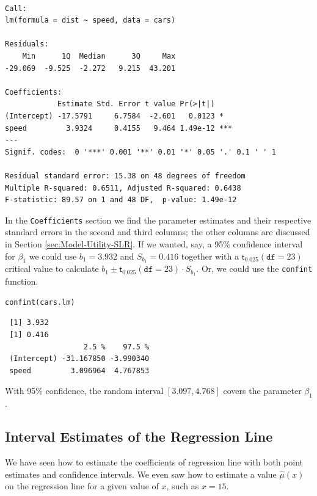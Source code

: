 \documentclass[captions=tableheading]{scrbook}
\begin{document}
\begin{verbatim}
 
Call:
lm(formula = dist ~ speed, data = cars)

Residuals:
    Min      1Q  Median      3Q     Max 
-29.069  -9.525  -2.272   9.215  43.201 

Coefficients:
            Estimate Std. Error t value Pr(>|t|)    
(Intercept) -17.5791     6.7584  -2.601   0.0123 *  
speed         3.9324     0.4155   9.464 1.49e-12 ***
---
Signif. codes:  0 '***' 0.001 '**' 0.01 '*' 0.05 '.' 0.1 ' ' 1 

Residual standard error: 15.38 on 48 degrees of freedom
Multiple R-squared: 0.6511,	Adjusted R-squared: 0.6438 
F-statistic: 89.57 on 1 and 48 DF,  p-value: 1.49e-12
\end{verbatim}

In the \texttt{Coefficients} section we find the parameter estimates and their respective standard errors in the second and third columns; the other columns are discussed in Section \ref{sec:Model-Utility-SLR}. If we wanted, say, a 95\% confidence interval for \(\beta_{1}\) we could use \( b_{1} =  3.932 \) and \( S_{b_{1}} =  0.416 \) together with a \( \mathsf{t}_{0.025}(\mathtt{df}=23) \) critical value to calculate \( b_{1} \pm \mathsf{t}_{0.025}(\mathtt{df} = 23) \cdot S_{b_{1}} \).  Or, we could use the \texttt{confint} function.


\begin{verbatim}
confint(cars.lm)
\end{verbatim}

\begin{verbatim}
 [1] 3.932
 [1] 0.416
                  2.5 %    97.5 %
 (Intercept) -31.167850 -3.990340
 speed         3.096964  4.767853
\end{verbatim}

With 95\% confidence, the random interval \( [  3.097,  4.768 ] \) covers the parameter \(\beta_{1}\).
\subsection{Interval Estimates of the Regression Line}
\label{sec-11-2-5}

\label{sub:slr-interval-est-regline}

We have seen how to estimate the coefficients of regression line with both point estimates and confidence intervals. We even saw how to estimate a value \(\hat{\mu}(x)\) on the regression line for a given value of \(x\), such as \(x=15\). 
\end{document}
